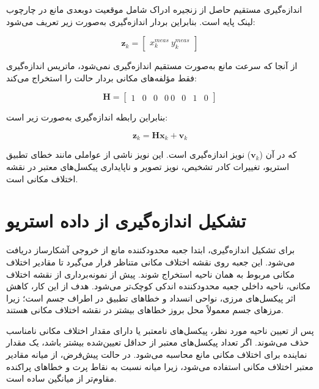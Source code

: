 اندازه‌گیری مستقیم حاصل از زنجیره ادراک شامل موقعیت دوبعدی مانع در چارچوب لینک پایه است. بنابراین بردار اندازه‌گیری به‌صورت زیر تعریف می‌شود:

\begin{equation}
	\mathbf{z}_k =
	\begin{bmatrix}
		x^{meas}_k \
		y^{meas}_k
	\end{bmatrix}
	\label{eq:app_kalman_measurement}
\end{equation}

از آنجا که سرعت مانع به‌صورت مستقیم اندازه‌گیری نمی‌شود، ماتریس اندازه‌گیری فقط مؤلفه‌های مکانی بردار حالت را استخراج می‌کند:

\begin{equation}
	\mathbf{H} =
	\begin{bmatrix}
		1 & 0 & 0 & 0 \
		0 & 0 & 1 & 0
	\end{bmatrix}
	\label{eq:app_kalman_H}
\end{equation}

بنابراین رابطه اندازه‌گیری به‌صورت زیر است:

\begin{equation}
	\mathbf{z}_k = \mathbf{H}\mathbf{x}_k + \mathbf{v}_k
	\label{eq:app_kalman_measurement_model}
\end{equation}

که در آن ($\mathbf{v}_k$) نویز اندازه‌گیری است. این نویز ناشی از عواملی مانند خطای تطبیق استریو، تغییرات کادر تشخیص، نویز تصویر و ناپایداری پیکسل‌های معتبر در نقشه اختلاف مکانی است.

\section{تشکیل اندازه‌گیری از داده استریو}

برای تشکیل اندازه‌گیری، ابتدا جعبه محدودکننده مانع از خروجی آشکارساز دریافت می‌شود. این جعبه روی نقشه اختلاف مکانی متناظر قرار می‌گیرد تا مقادیر اختلاف مکانی مربوط به همان ناحیه استخراج شوند. پیش از نمونه‌برداری از نقشه اختلاف مکانی، ناحیه داخلی جعبه محدودکننده اندکی کوچک‌تر می‌شود. هدف از این کار، کاهش اثر پیکسل‌های مرزی، نواحی انسداد و خطاهای تطبیق در اطراف جسم است؛ زیرا مرزهای جسم معمولاً محل بروز خطاهای بیشتر در نقشه اختلاف مکانی هستند.

پس از تعیین ناحیه مورد نظر، پیکسل‌های نامعتبر یا دارای مقدار اختلاف مکانی نامناسب حذف می‌شوند. اگر تعداد پیکسل‌های معتبر از حداقل تعیین‌شده بیشتر باشد، یک مقدار نماینده برای اختلاف مکانی مانع محاسبه می‌شود. در حالت پیش‌فرض، از میانه مقادیر معتبر اختلاف مکانی استفاده می‌شود، زیرا میانه نسبت به نقاط پرت و خطاهای پراکنده مقاوم‌تر از میانگین ساده است.

